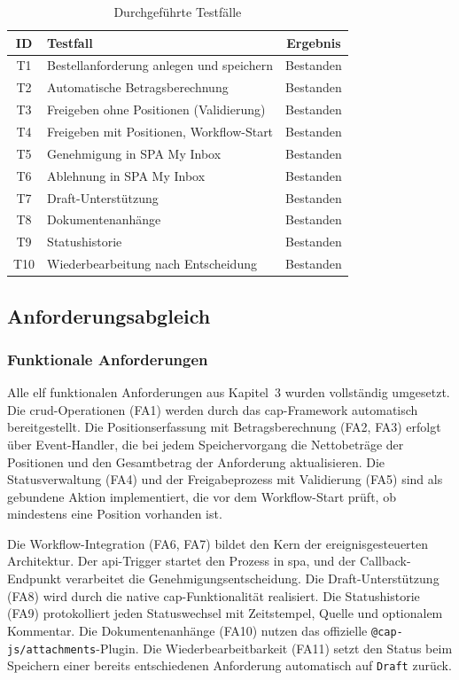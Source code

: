 \begin{table}[H]
\centering
\caption{Durchgeführte Testfälle}
\label{tab:testfaelle}
\begin{tabularx}{\textwidth}{c|X|c}
\hline
\textbf{ID} & \textbf{Testfall} & \textbf{Ergebnis} \\
\hline
T1 & Bestellanforderung anlegen und speichern & Bestanden \\
T2 & Automatische Betragsberechnung & Bestanden \\
T3 & Freigeben ohne Positionen (Validierung) & Bestanden \\
T4 & Freigeben mit Positionen, Workflow-Start & Bestanden \\
T5 & Genehmigung in SPA My Inbox & Bestanden \\
T6 & Ablehnung in SPA My Inbox & Bestanden \\
T7 & Draft-Unterstützung & Bestanden \\
T8 & Dokumentenanhänge & Bestanden \\
T9 & Statushistorie & Bestanden \\
T10 & Wiederbearbeitung nach Entscheidung & Bestanden \\
\hline
\end{tabularx}
\end{table}

\subsection{Anforderungsabgleich}

\subsubsection{Funktionale Anforderungen}

Alle elf funktionalen Anforderungen aus Kapitel~3 wurden vollständig umgesetzt. Die \gls{crud}-Operationen (FA1) werden durch das \gls{cap}-Framework automatisch bereitgestellt. Die Positionserfassung mit Betragsberechnung (FA2, FA3) erfolgt über Event-Handler, die bei jedem Speichervorgang die Nettobeträge der Positionen und den Gesamtbetrag der Anforderung aktualisieren. Die Statusverwaltung (FA4) und der Freigabeprozess mit Validierung (FA5) sind als gebundene Aktion implementiert, die vor dem Workflow-Start prüft, ob mindestens eine Position vorhanden ist.

Die Workflow-Integration (FA6, FA7) bildet den Kern der ereignisgesteuerten Architektur. Der \gls{api}-Trigger startet den Prozess in \gls{spa}, und der Callback-Endpunkt verarbeitet die Genehmigungsentscheidung. Die Draft-Unterstützung (FA8) wird durch die native \gls{cap}-Funktionalität realisiert. Die Statushistorie (FA9) protokolliert jeden Statuswechsel mit Zeitstempel, Quelle und optionalem Kommentar. Die Dokumentenanhänge (FA10) nutzen das offizielle \texttt{@cap-js/attachments}-Plugin. Die Wiederbearbeitbarkeit (FA11) setzt den Status beim Speichern einer bereits entschiedenen Anforderung automatisch auf \texttt{Draft} zurück.

